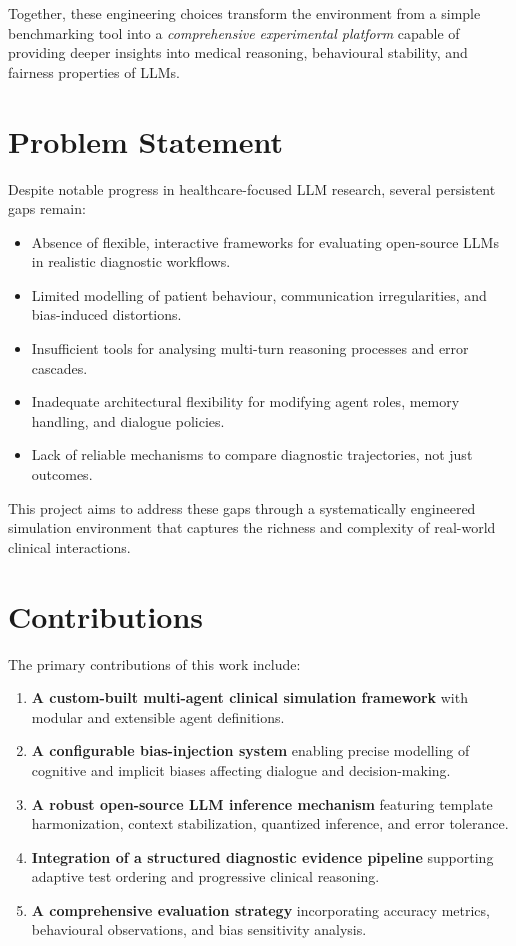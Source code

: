 Together, these engineering choices transform the environment from a simple benchmarking tool into a \textit{comprehensive experimental platform} capable of providing deeper insights into medical reasoning, behavioural stability, and fairness properties of LLMs.

\section{Problem Statement}

Despite notable progress in healthcare-focused LLM research, several persistent gaps remain:

\begin{itemize}
    \item Absence of flexible, interactive frameworks for evaluating open-source LLMs in realistic diagnostic workflows.
    \item Limited modelling of patient behaviour, communication irregularities, and bias-induced distortions.
    \item Insufficient tools for analysing multi-turn reasoning processes and error cascades.
    \item Inadequate architectural flexibility for modifying agent roles, memory handling, and dialogue policies.
    \item Lack of reliable mechanisms to compare diagnostic trajectories, not just outcomes.
\end{itemize}

This project aims to address these gaps through a systematically engineered simulation environment that captures the richness and complexity of real-world clinical interactions.

\section{Contributions}

The primary contributions of this work include:

\begin{enumerate}
    \item \textbf{A custom-built multi-agent clinical simulation framework} with modular and extensible agent definitions.
    \item \textbf{A configurable bias-injection system} enabling precise modelling of cognitive and implicit biases affecting dialogue and decision-making.
    \item \textbf{A robust open-source LLM inference mechanism} featuring template harmonization, context stabilization, quantized inference, and error tolerance.
    \item \textbf{Integration of a structured diagnostic evidence pipeline} supporting adaptive test ordering and progressive clinical reasoning.
    \item \textbf{A comprehensive evaluation strategy} incorporating accuracy metrics, behavioural observations, and bias sensitivity analysis.
\end{enumerate}
